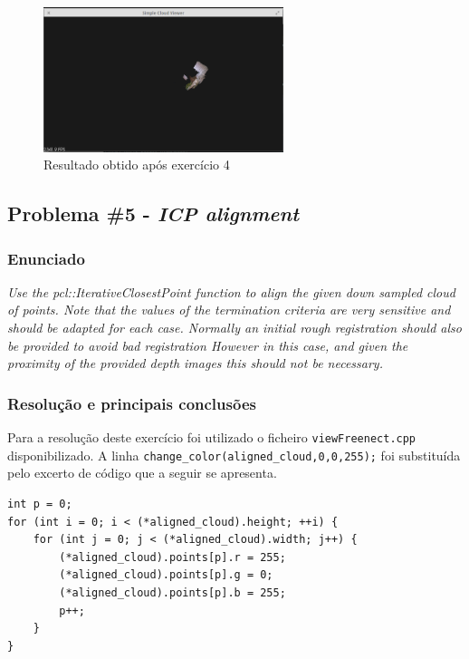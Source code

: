 \documentclass[portuguese, times, mirror]{revdetua}
\begin{document}
\begin{figure}[ht!]
\centering
\includegraphics[width=70mm]{img/ex4_3.png}
\caption{Resultado obtido após exercício 4}
\end{figure}



\subsection{Problema \#5 - \textit{ICP alignment}}

\subsubsection{Enunciado}
\textit{Use the pcl::IterativeClosestPoint function to align the given down sampled cloud of points. Note 
that the values of the termination criteria are very sensitive and should be adapted for each case.
Normally an initial rough registration should also be provided to avoid bad registration However in this
case, and given the proximity of the provided depth images this should not be necessary. }


\subsubsection{Resolução e principais conclusões}

Para a resolução deste exercício foi utilizado o ficheiro \texttt{viewFreenect.cpp} disponibilizado. A linha \texttt{change\_color(aligned\_cloud,0,0,255);} foi substituída pelo excerto de código que a seguir se apresenta. 

\newpage

\begin{lstlisting}[caption=colors cloudAligned red for viewing purposes,label=code:C]
int p = 0;
for (int i = 0; i < (*aligned_cloud).height; ++i) {
    for (int j = 0; j < (*aligned_cloud).width; j++) {
        (*aligned_cloud).points[p].r = 255;
        (*aligned_cloud).points[p].g = 0;
        (*aligned_cloud).points[p].b = 255;
        p++;
    }
} 
\end{lstlisting}
\end{document}
